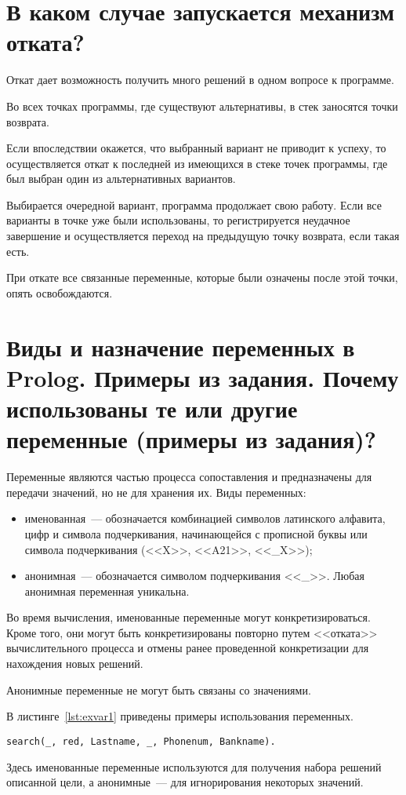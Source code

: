 \section{В каком случае запускается механизм отката?}
Откат дает возможность получить много решений в одном вопросе к программе.

Во всех точках программы, где существуют альтернативы, в стек заносятся точки возврата.

Если впоследствии окажется, что выбранный вариант не приводит к успеху, то осуществляется откат к последней из имеющихся в стеке точек программы, где был выбран один из альтернативных вариантов.

Выбирается очередной вариант, программа продолжает свою работу. Если все варианты в точке уже были использованы, то регистрируется неудачное завершение и осуществляется переход на предыдущую точку возврата, если такая есть.

При откате все связанные переменные, которые были означены после этой точки, опять освобождаются.

\section{Виды и назначение переменных в Prolog. Примеры из задания. Почему использованы те или другие переменные (примеры из задания)?}
Переменные являются частью процесса сопоставления и предназначены для передачи значений, но не для хранения их. Виды переменных:
\begin{itemize}
    \item именованная~--- обозначается комбинацией символов латинского алфавита, цифр и символа подчеркивания, начинающейся с прописной буквы или символа подчеркивания (<<X>>, <<A21>>, <<\_X>>);
    \item анонимная~--- обозначается символом подчеркивания <<\_>>. Любая анонимная переменная уникальна.
\end{itemize}

Во время вычисления, именованные переменные могут конкретизироваться. Кроме того, они могут быть конкретизированы повторно путем <<отката>> вычислительного процесса и отмены ранее проведенной конкретизации для нахождения новых решений.

Анонимные переменные не могут быть связаны со значениями.

В листинге~\ref{lst:exvar1} приведены примеры использования переменных.
\begin{lstlisting}[caption={Примеры переменных},label=lst:exvar1]
  search(_, red, Lastname, _, Phonenum, Bankname).
\end{lstlisting}
Здесь именованные переменные используются для получения набора решений описанной цели, а анонимные~--- для игнорирования некоторых значений.

